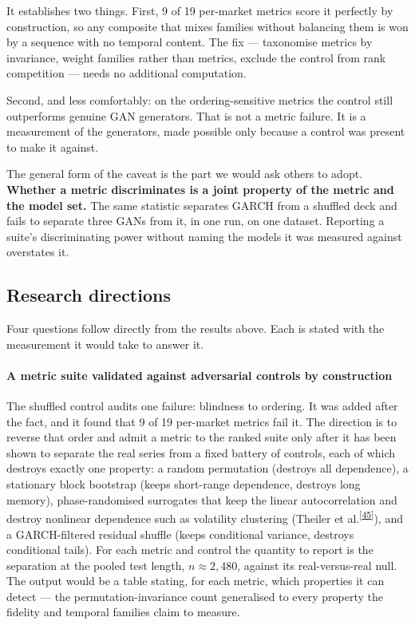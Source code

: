 \documentclass[11pt,a4paper]{article}
\makeatletter
\newcommand{\tcite}[1]{\textsuperscript{[\hyperlink{R:#1}{#1}]}}
\DeclareRobustCommand{\_}{\ifmmode\nfss@text{\textunderscore}\else\textunderscore\allowbreak\fi}
\makeatother
\begin{document}
It establishes two things. First, 9 of 19 per-market metrics score it perfectly by construction, so any composite that mixes families without balancing them is won by a sequence with no temporal content. The fix --- taxonomise metrics by invariance, weight families rather than metrics, exclude the control from rank competition --- needs no additional computation.

Second, and less comfortably: on the ordering-sensitive metrics the control still outperforms genuine GAN generators. That is not a metric failure. It is a measurement of the generators, made possible only because a control was present to make it against.

The general form of the caveat is the part we would ask others to adopt. \textbf{Whether a metric discriminates is a joint property of the metric and the model set.} The same statistic separates GARCH from a shuffled deck and fails to separate three GANs from it, in one run, on one dataset. Reporting a suite's discriminating power without naming the models it was measured against overstates it.

\subsection{Research directions}
\label{sec:directions}
Four questions follow directly from the results above. Each is stated with the measurement it would take to answer it.

\paragraph{A metric suite validated against adversarial controls by construction} The shuffled control audits one failure: blindness to ordering. It was added after the fact, and it found that 9 of 19 per-market metrics fail it. The direction is to reverse that order and admit a metric to the ranked suite only after it has been shown to separate the real series from a fixed battery of controls, each of which destroys exactly one property: a random permutation (destroys all dependence), a stationary block bootstrap (keeps short-range dependence, destroys long memory), phase-randomised surrogates that keep the linear autocorrelation and destroy nonlinear dependence such as volatility clustering (Theiler et al.\tcite{45}), and a GARCH-filtered residual shuffle (keeps conditional variance, destroys conditional tails). For each metric and control the quantity to report is the separation at the pooled test length, $n\approx2{,}480$, against its real-versus-real null. The output would be a table stating, for each metric, which properties it can detect --- the permutation-invariance count generalised to every property the fidelity and temporal families claim to measure.
\end{document}
